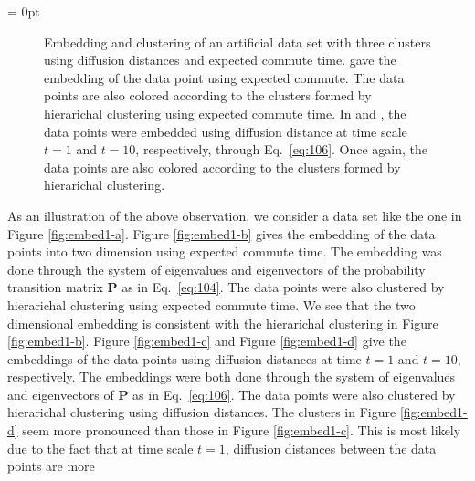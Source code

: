 \subfiglabelskip = 0pt
\begin{figure}[htbp]
  \centering
    \hspace{8pt}
        \caption{Embedding and clustering of an artificial data set
          with three clusters  using diffusion
          distances and expected commute time. 
          gave the embedding of the data point using expected
          commute. The data points are also colored according to the
          clusters formed by hierarichal clustering using expected
          commute time. In  and
          , the data points were embedded using
          diffusion distance at time scale $t = 1$ and $t = 10$,
          respectively, through Eq.~\eqref{eq:106}. Once again, the
          data points are also colored according to the clusters
          formed by hierarichal clustering.}
  \label{fig:embed1}
\end{figure}
As an illustration of the above observation, we consider a data set
like the one in Figure \ref{fig:embed1-a}. Figure \ref{fig:embed1-b}
gives the embedding of the data points into two dimension using
expected commute time. The embedding was done through the system of
eigenvalues and eigenvectors of the probability transition matrix
$\mathbf{P}$ as in Eq.~\eqref{eq:104}. The data points were also
clustered by hierarichal clustering using expected commute time. We
see that the two dimensional embedding is consistent with the
hierarichal clustering in Figure \ref{fig:embed1-b}. Figure
\ref{fig:embed1-c} and Figure \ref{fig:embed1-d} give the embeddings of
the data points using diffusion distances at time $t = 1$ and $t =
10$, respectively. The embeddings were both done through the system of
eigenvalues and eigenvectors of $\mathbf{P}$ as in
Eq.~\eqref{eq:106}. The data points were also clustered by hierarichal
clustering using diffusion distances. The clusters in Figure
\ref{fig:embed1-d} seem more pronounced than those in Figure
\ref{fig:embed1-c}. This is most likely due to the fact that at time
scale $t = 1$, diffusion distances between the data points are more
